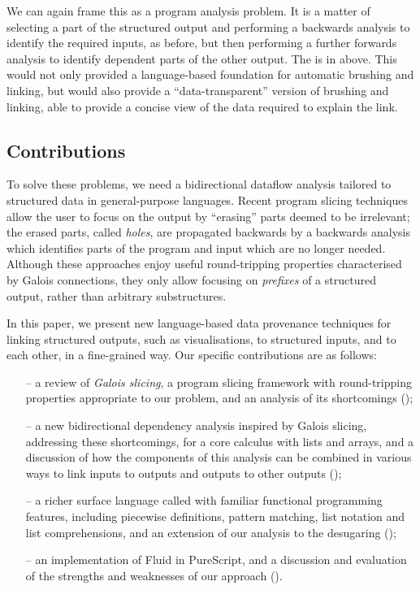 We can again frame this as a program analysis problem. It is a matter of selecting a part of the structured output and performing a backwards analysis to identify the required inputs, as before, but then performing a further forwards analysis to identify dependent parts of the other output. The is in  above. This would not only provided a language-based foundation for automatic brushing and linking, but would also provide a ``data-transparent'' version of brushing and linking, able to provide a concise view of the data required to explain the link.

\subsection{Contributions}

To solve these problems, we need a bidirectional dataflow analysis tailored to structured data in general-purpose languages. Recent program slicing techniques \cite{perera12a,perera13a,ricciotti17} allow the user to focus on the output by ``erasing'' parts deemed to be irrelevant; the erased parts, called \emph{holes}, are propagated backwards by a backwards analysis which identifies parts of the program and input which are no longer needed. Although these approaches enjoy useful round-tripping properties characterised by Galois connections, they only allow focusing on \emph{prefixes} of a structured output, rather than arbitrary substructures.

In this paper, we present new language-based data provenance techniques for linking structured outputs, such as visualisations, to structured inputs, and to each other, in a fine-grained way. Our specific contributions are as follows:

\begin{itemize}[leftmargin=*]
   \item[--] a review of \emph{Galois slicing}, a program slicing framework with round-tripping properties appropriate to our problem, and an analysis of its shortcomings ();
   \item[--] a new bidirectional dependency analysis inspired by Galois slicing, addressing these shortcomings, for a core calculus with lists and arrays, and a discussion of how the components of this analysis can be combined in various ways to link inputs to outputs and outputs to other outputs ();
   \item[--] a richer surface language called \OurLanguage with familiar functional programming features, including piecewise definitions, pattern matching, list notation and list comprehensions, and an extension of our analysis to the desugaring ();
   \item[--] an implementation of Fluid in PureScript, and a discussion and evaluation of the strengths and weaknesses of our approach ().
\end{itemize}
